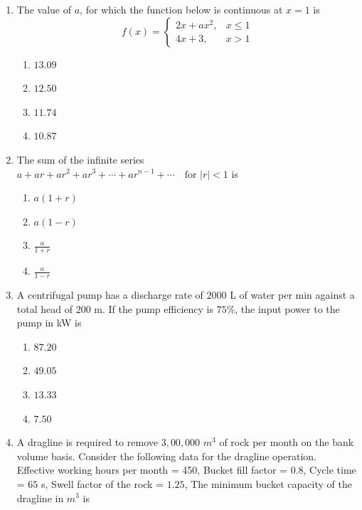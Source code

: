 \documentclass[journal,12pt,onecolumn]{IEEEtran}
\theoremstyle{remark}
\begin{document}
\begin{enumerate}
\item The value of $a$, for which the function below is continuous at $x = 1$ is
\[
f(x) =
\begin{cases}
2x + ax^2, & x \leq 1 \\
4x + 3, & x > 1
\end{cases}
\]
\hfill{}
\begin{multicols}{4}
\begin{enumerate}
\item $13.09$
\item $12.50$
\item $11.74$
\item $10.87$
\end{enumerate}
\end{multicols}

\item The sum of the infinite series 
$a + ar + ar^{2} + ar^{3} + \cdots + ar^{n-1} + \cdots \quad \text{for } |r| < 1$
is
\hfill{}

\begin{multicols}{4}
\begin{enumerate}
\item $a(1+r)$
\item $a(1-r)$
\item $\frac{a}{1+r}$
\item $\frac{a}{1-r}$
\end{enumerate}
\end{multicols}

\item A centrifugal pump has a discharge rate of $2000$ L of water per min against a total head of $200$ m. If the pump efficiency is $75$\%, the input power to the pump in kW is

\hfill{}
\begin{multicols}{4}
\begin{enumerate}
\item $87.20$
\item $49.05$
\item $ 13.33$
\item $7.50$
\end{enumerate}
\end{multicols}

\item  A dragline is required to remove $3,00,000$ $m^3$ of rock per month on the bank volume basis.
Consider the following data for the dragline operation.\\
Effective working hours per month = 450,
Bucket fill factor = $0.8$,
Cycle time = $65$ s,
Swell factor of the rock = $1.25$,
The minimum bucket capacity of the dragline in $m^3$ is


\end{enumerate}
\end{document}
